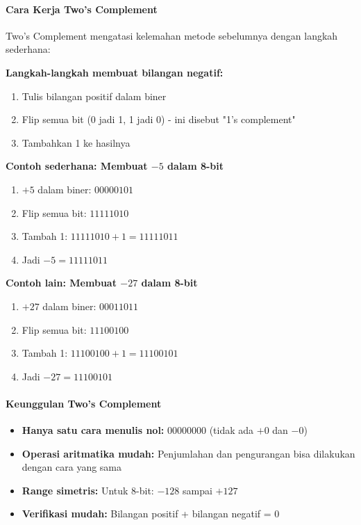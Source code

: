 \paragraph{Cara Kerja Two's Complement}
Two's Complement mengatasi kelemahan metode sebelumnya dengan langkah sederhana:

\textbf{Langkah-langkah membuat bilangan negatif:}
\begin{enumerate}
    \item Tulis bilangan positif dalam biner
    \item Flip semua bit (0 jadi 1, 1 jadi 0) - ini disebut "1's complement"
    \item Tambahkan 1 ke hasilnya
\end{enumerate}

\textbf{Contoh sederhana: Membuat \(-5\) dalam 8-bit}
\begin{enumerate}
    \item \(+5\) dalam biner: \(00000101\)
    \item Flip semua bit: \(11111010\)
    \item Tambah 1: \(11111010 + 1 = 11111011\)
    \item Jadi \(-5 = 11111011\)
\end{enumerate}

\textbf{Contoh lain: Membuat \(-27\) dalam 8-bit}
\begin{enumerate}
    \item \(+27\) dalam biner: \(00011011\)
    \item Flip semua bit: \(11100100\)
    \item Tambah 1: \(11100100 + 1 = 11100101\)
    \item Jadi \(-27 = 11100101\)
\end{enumerate}

\paragraph{Keunggulan Two's Complement}
\begin{itemize}
    \item \textbf{Hanya satu cara menulis nol:} \(00000000\) (tidak ada \(+0\) dan \(-0\))
    \item \textbf{Operasi aritmatika mudah:} Penjumlahan dan pengurangan bisa dilakukan dengan cara yang sama
    \item \textbf{Range simetris:} Untuk 8-bit: \(-128\) sampai \(+127\)
    \item \textbf{Verifikasi mudah:} Bilangan positif + bilangan negatif = 0
\end{itemize}

